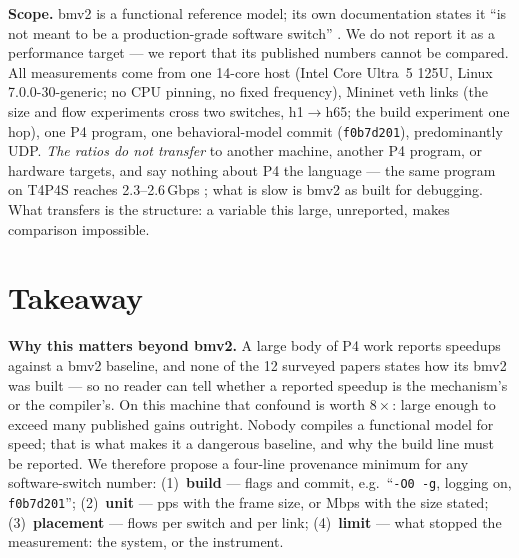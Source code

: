 \documentclass[sigconf,nonacm,anonymous]{acmart}
\begin{document}
\textbf{Scope.} bmv2 is a functional reference model; its own documentation
states it ``is not meant to be a production-grade software switch''
\cite{bmv2repo}. We do not report it as a performance target --- we report
that its published numbers cannot be compared. All measurements come from one
14-core host (Intel Core Ultra~5 125U, Linux 7.0.0-30-generic; no CPU pinning,
no fixed frequency), Mininet veth links (the size and flow experiments cross
two switches, h1$\to$h65; the build experiment one hop), one P4 program, one
behavioral-model commit (\texttt{f0b7d201}), predominantly UDP. \emph{The ratios do not transfer} to
another machine, another P4 program, or hardware targets, and say nothing
about P4 the language --- the same program on T4P4S reaches 2.3--2.6\,Gbps
\cite{kumazoe2023icncc}; what is slow is bmv2 as built for debugging. What
transfers is the structure: a variable this large, unreported, makes
comparison impossible.

\section{Takeaway}

\textbf{Why this matters beyond bmv2.} A large body of P4 work reports
speedups against a bmv2 baseline, and none of the 12 surveyed papers states
how its bmv2 was built --- so no reader can tell whether a reported speedup is
the mechanism's or the compiler's. On this machine that confound is worth
$8\times$: large enough to exceed many published gains outright. Nobody
compiles a functional model for speed; that is what makes it a dangerous
baseline, and why the build line must be reported. We therefore propose a
four-line provenance minimum for any software-switch number:
(1)~\textbf{build} --- flags and commit, e.g.\ ``\texttt{-O0 -g}, logging on,
\texttt{f0b7d201}''; (2)~\textbf{unit} --- pps with the frame size, or Mbps
with the size stated; (3)~\textbf{placement} --- flows per switch and per
link; (4)~\textbf{limit} --- what stopped the measurement: the system, or the
instrument.



\end{document}
